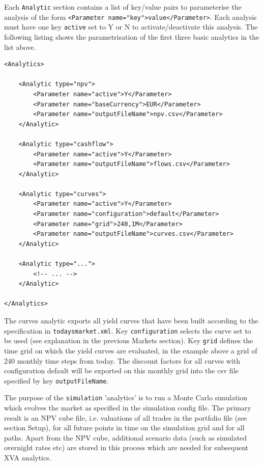 \documentclass[12pt, a4paper]{article}
\begin{document}
Each {\tt Analytic} section contains a list of key/value pairs to parameterise the analysis of the form {\tt <Parameter name="key">value</Parameter>}. Each analysis
must have one key {\tt active} set to Y or N to activate/deactivate this analysis. 
The following listing shows the parametrisation of the first three basic analytics in the list above.

{\footnotesize
\begin{lstlisting}[caption={ORE analytics: npv, cashflow and curves},
 	label=lst:ore_analytics]
<Analytics>
    
	<Analytic type="npv">
		<Parameter name="active">Y</Parameter>
		<Parameter name="baseCurrency">EUR</Parameter>
		<Parameter name="outputFileName">npv.csv</Parameter>
	</Analytic>      

	<Analytic type="cashflow">
		<Parameter name="active">Y</Parameter>
		<Parameter name="outputFileName">flows.csv</Parameter>
	</Analytic>      

	<Analytic type="curves">
		<Parameter name="active">Y</Parameter>
		<Parameter name="configuration">default</Parameter>
		<Parameter name="grid">240,1M</Parameter>
		<Parameter name="outputFileName">curves.csv</Parameter>
	</Analytic>      

	<Analytic type="...">
		<!-- ... -->
	</Analytic>      

</Analytics>      
\end{lstlisting}
}

The curves analytic exports all yield curves that have been built according to the specification in {\tt todaysmarket.xml}. Key {\tt configuration} selects the curve set to be used (see explanation in the previous Markets section).  Key {\tt grid} defines the time grid on which the yield curves are evaluated, in the example above a grid of 240 monthly time steps from today. The discount factors for all curves with configuration default will be exported on this monthly grid into the csv file specified by key {\tt outputFileName}.

\medskip
The purpose of the {\tt simulation} 'analytics' is to run a Monte Carlo simulation which evolves the market as specified in the simulation config file. The primary result is an NPV cube file, i.e. valuations of all trades in the portfolio file (see section Setup), for all future points in time on the simulation grid and for all paths. Apart from the NPV cube, additional scenario data (such as simulated overnight rates etc) are stored in this process which are needed for subsequent XVA analytics.  
\end{document}

